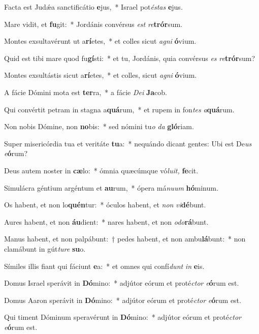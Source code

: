 \item Facta est Judǽa sanctificátio \textbf{e}jus,~* Israel pot\textit{éstas} \textbf{e}jus.
\item Mare vidit, et \textbf{fu}git:~* Jordánis convérsus \textit{est} \textit{re}\textbf{trór}sum.
\item Montes exsultavérunt ut a\textbf{rí}etes,~* et colles sicut \textit{agni} \textbf{ó}vium.
\item Quid est tibi mare quod fu\textbf{gí}sti:~* et tu, Jordánis, quia convérsus \textit{es} \textit{re}\textbf{trór}sum?
\item Montes exsultástis sicut a\textbf{rí}etes,~* et colles, sicut \textit{agni} \textbf{ó}vium.
\item A fácie Dómini mota est \textbf{ter}ra,~* a fácie \textit{Dei} \textbf{Ja}cob.
\item Qui convértit petram in stagna a\textbf{quá}rum,~* et rupem in fon\textit{tes} \textit{a}\textbf{quá}rum.
\item Non nobis Dómine, non \textbf{no}bis:~* sed nómini tu\textit{o} \textit{da} \textbf{gló}riam.
\item Super misericórdia tua et veritáte \textbf{tu}a:~* nequándo dicant gentes: Ubi est De\hspace{0.02em}\textit{us} \textit{e}\textbf{ó}rum?
\item Deus autem noster in \textbf{cæ}lo:~* ómnia quæcúmque vó\textit{luit,} \textbf{fe}cit.
\item Simulácra géntium argéntum et \textbf{au}rum,~* ópera má\textit{nuum} \textbf{hó}minum.
\item Os habent, et non lo\textbf{quén}tur:~* óculos habent, et \textit{non} \textit{vi}\textbf{dé}bunt.
\item Aures habent, et non \textbf{áu}dient:~* nares habent, et non \textit{odo}\textbf{rá}bunt.
\item Manus habent, et non palpábunt:~† pedes habent, et non ambu\textbf{lá}bunt:~* non clamábunt in gút\textit{ture} \textbf{su}o.
\item Símiles illis fiant qui fáciunt \textbf{e}a:~* et omnes qui confí\hspace{0.02em}\textit{dunt} \textit{in} \textbf{e}is.
\item Domus Israel sperávit in \textbf{Dó}mino:~* adjútor eórum et proté\textit{ctor} \textit{e}\textbf{ó}rum est.
\item Domus Aaron sperávit in \textbf{Dó}mino:~* adjútor eórum et proté\textit{ctor} \textit{e}\textbf{ó}rum est.
\item Qui timent Dóminum speravérunt in \textbf{Dó}mino:~* adjútor eórum et proté\textit{ctor} \textit{e}\textbf{ó}rum est.
